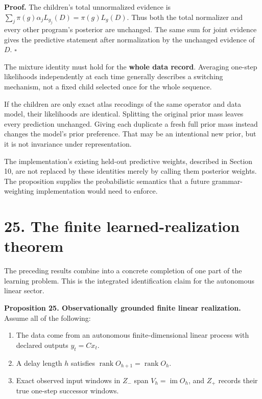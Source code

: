 \documentclass[11pt,letterpaper]{article}
\providecommand{\tightlist}{\setlength{\itemsep}{0pt}\setlength{\parskip}{0pt}}
\begin{document}
\textbf{Proof.} The children's total unnormalized evidence is
\(\sum_j\pi(g)\alpha_jL_{g_j}(D)=\pi(g)L_g(D)\). Thus both the total
normalizer and every other program's posterior are unchanged. The same
sum for joint evidence gives the predictive statement after
normalization by the unchanged evidence of \(D\). \(\square\)

The mixture identity must hold for the \textbf{whole data record}.
Averaging one-step likelihoods independently at each time generally
describes a switching mechanism, not a fixed child selected once for the
whole sequence.

If the children are only exact atlas recodings of the same operator and
data model, their likelihoods are identical. Splitting the original
prior mass leaves every prediction unchanged. Giving each duplicate a
fresh full prior mass instead changes the model's prior preference. That
may be an intentional new prior, but it is not invariance under
representation.

The implementation's existing held-out predictive weights, described in
Section 10, are not replaced by these identities merely by calling them
posterior weights. The proposition supplies the probabilistic semantics
that a future grammar-weighting implementation would need to enforce.

\section{25. The finite learned-realization
theorem}\label{the-finite-learned-realization-theorem}

The preceding results combine into a concrete completion of one part of
the learning problem. This is the integrated identification claim for
the autonomous linear sector.

\textbf{Proposition 25. Observationally grounded finite linear
realization.} Assume all of the following:

\begin{enumerate}
\def\labelenumi{\arabic{enumi}.}
\tightlist
\item
  The data come from an autonomous finite-dimensional linear process
  with declared outputs \(y_t=Cx_t\).
\item
  A delay length \(h\) satisfies
  \(\operatorname{rank}O_{h+1}=\operatorname{rank}O_h\).
\item
  Exact observed input windows in \(Z_-\) span
  \(V_h=\operatorname{im}O_h\), and \(Z_+\) records their true one-step
  successor windows.
\end{enumerate}
\end{document}
